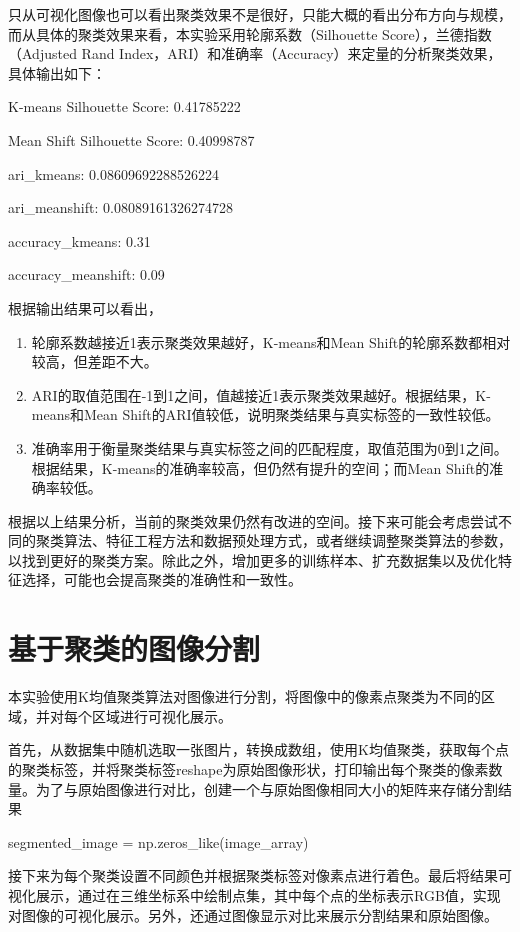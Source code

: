 \documentclass[lettersize,journal]{IEEEtran}
\begin{document}
只从可视化图像也可以看出聚类效果不是很好，只能大概的看出分布方向与规模，而从具体的聚类效果来看，本实验采用轮廓系数（Silhouette Score），兰德指数（Adjusted Rand Index，ARI）和准确率（Accuracy）来定量的分析聚类效果，具体输出如下：

K-means Silhouette Score: 0.41785222

Mean Shift Silhouette Score: 0.40998787

ari\_kmeans: 0.08609692288526224

ari\_meanshift: 0.08089161326274728

accuracy\_kmeans: 0.31

accuracy\_meanshift: 0.09

根据输出结果可以看出，

\begin{enumerate}
    \item 轮廓系数越接近1表示聚类效果越好，K-means和Mean Shift的轮廓系数都相对较高，但差距不大。
    \item ARI的取值范围在-1到1之间，值越接近1表示聚类效果越好。根据结果，K-means和Mean Shift的ARI值较低，说明聚类结果与真实标签的一致性较低。
    \item 准确率用于衡量聚类结果与真实标签之间的匹配程度，取值范围为0到1之间。根据结果，K-means的准确率较高，但仍然有提升的空间；而Mean Shift的准确率较低。
\end{enumerate}

根据以上结果分析，当前的聚类效果仍然有改进的空间。接下来可能会考虑尝试不同的聚类算法、特征工程方法和数据预处理方式，或者继续调整聚类算法的参数，以找到更好的聚类方案。除此之外，增加更多的训练样本、扩充数据集以及优化特征选择，可能也会提高聚类的准确性和一致性。




\section{基于聚类的图像分割}

本实验使用K均值聚类算法对图像进行分割，将图像中的像素点聚类为不同的区域，并对每个区域进行可视化展示。

首先，从数据集中随机选取一张图片，转换成数组，使用K均值聚类，获取每个点的聚类标签，并将聚类标签reshape为原始图像形状，打印输出每个聚类的像素数量。为了与原始图像进行对比，创建一个与原始图像相同大小的矩阵来存储分割结果

segmented\_image = np.zeros\_like(image\_array)

接下来为每个聚类设置不同颜色并根据聚类标签对像素点进行着色。最后将结果可视化展示，通过在三维坐标系中绘制点集，其中每个点的坐标表示RGB值，实现对图像的可视化展示。另外，还通过图像显示对比来展示分割结果和原始图像。
\end{document}

